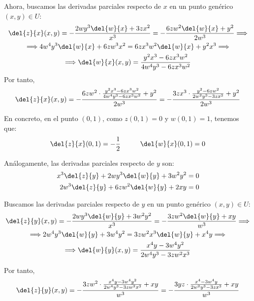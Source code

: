 \begin{ejercicio}
    Ahora, buscamos las derivadas parciales respecto de $x$ en un punto genérico $(x,y)\in U$:
    \begin{multline*}
        \del{z}{x}(x,y) = -\frac{2wy^3\del{w}{x} + 3zx^2}{x^3}
        = -\frac{6zw^2\del{w}{x} +y^2}{2w^3} \Longrightarrow \\
        \Longrightarrow 4w^4y^3\del{w}{x} + 6zw^3x^2 = 6zx^3w^2\del{w}{x} + y^2x^3 \Longrightarrow \\
        \Longrightarrow \del{w}{x}(x,y) = \frac{y^2x^3 - 6zx^3w^2}{4w^4y^3 - 6zx^3w^2}
    \end{multline*}
    Por tanto,
    \begin{equation*}
        \del{z}{x}(x,y) = -\frac{6zw^2\cdot \frac{y^2x^3 - 6zx^3w^2}{4w^4y^3 - 6zx^3w^2} +y^2}{2w^3}
        = -\frac{3zx^3\cdot \frac{y^2 - 6zw^2}{2w^2y^3 - 3zx^3} +y^2}{2w^3}
    \end{equation*}

    En concreto, en el punto $(0,1)$, como $z(0,1)=0$ y $w(0,1)=1$, tenemos que:
    \begin{equation*}
        \del{z}{x}(0,1) = -\frac{1}{2} \hspace{1cm}
        \del{w}{x}(0,1) = 0
    \end{equation*}

    Análogamente, las derivadas parciales respecto de $y$ son:
    \begin{align*}
        x^3\del{z}{y} + 2wy^3\del{w}{y} + 3w^2y^2 &= 0 \\
        2w^3\del{z}{y} + 6zw^2\del{w}{y} +2xy&= 0
    \end{align*}

    Buscamos las derivadas parciales respecto de $y$ en un punto genérico $(x,y)\in U$:
    \begin{multline*}
        \del{z}{y}(x,y) = -\frac{2wy^3\del{w}{y} + 3w^2y^2}{x^3}
        = -\frac{3zw^2\del{w}{y} +xy}{w^3} \Longrightarrow \\
        \Longrightarrow 2w^4y^3\del{w}{y} + 3w^4y^2 = 3zw^2x^3\del{w}{y} + x^4y \Longrightarrow \\
        \Longrightarrow \del{w}{y}(x,y) = \frac{x^4y - 3w^4y^2}{2w^4y^3 - 3zw^2x^3}
    \end{multline*}

    Por tanto,
    \begin{equation*}
        \del{z}{y}(x,y) = -\frac{3zw^2\cdot \frac{x^4y - 3w^4y^2}{2w^4y^3 - 3zw^2x^3} +xy}{w^3}
        = -\frac{3yz\cdot \frac{x^4 - 3w^4y}{2w^2y^3 - 3zx^3} +xy}{w^3}
    \end{equation*}


\end{ejercicio}
